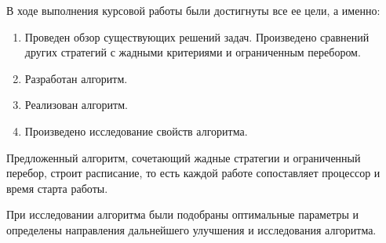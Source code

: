 В ходе выполнения курсовой работы были достигнуты все ее цели, а именно:
\begin{enumerate}
    \item Проведен обзор существующих решений задач. Произведено сравнений других стратегий с жадными критериями и ограниченным перебором.
    \item Разработан алгоритм.
    \item Реализован алгоритм.
    \item Произведено исследование свойств алгоритма.
\end{enumerate}

Предложенный алгоритм, сочетающий жадные стратегии и ограниченный перебор, строит расписание, то есть каждой работе сопоставляет процессор и время старта работы.

При исследовании алгоритма были подобраны оптимальные параметры и определены направления дальнейшего улучшения и исследования алгоритма. 